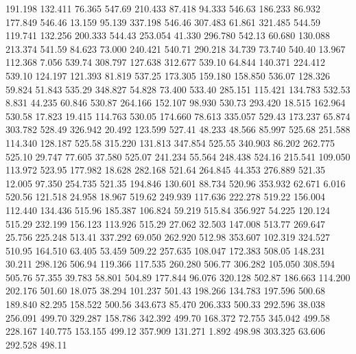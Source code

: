 191.198  132.411   76.365       547.69
 210.433   87.418   94.333       546.63
 186.233   86.932  177.849       546.46
  13.159   95.139  337.198       546.46
 307.483   61.861  321.485       544.59
 119.741  132.256  200.333       544.43
 253.054   41.330  296.780       542.13
  60.680  130.088  213.374       541.59
  84.623   73.000  240.421       540.71
 290.218   34.739   73.740       540.40
  13.967  112.368    7.056       539.74
 308.797  127.638  312.677       539.10
  64.844  140.371  224.412       539.10
 124.197  121.393   81.819       537.25
 173.305  159.180  158.850       536.07
 128.326   59.824   51.843       535.29
 348.827   54.828   73.400       533.40
 285.151  115.421  134.783       532.53
   8.831   44.235   60.846       530.87
 264.166  152.107   98.930       530.73
 293.420   18.515  162.964       530.58
  17.823   19.415  114.763       530.05
 174.660   78.613  335.057       529.43
 173.237   65.874  303.782       528.49
 326.942   20.492  123.599       527.41
  48.233   48.566   85.997       525.68
 251.588  114.340  128.187       525.58
 315.220  131.813  347.854       525.55
 340.903   86.202  262.775       525.10
  29.747   77.605   37.580       525.07
 241.234   55.564  248.438       524.16
 215.541  109.050  113.972       523.95
 177.982   18.628  282.168       521.64
 264.845   44.353  276.889       521.35
  12.005   97.350  254.735       521.35
 194.846  130.601   88.734       520.96
 353.932   62.671    6.016       520.56
 121.518   24.958   18.967       519.62
 249.939  117.636  222.278       519.22
 156.004  112.440  134.436       515.96
 185.387  106.824   59.219       515.84
 356.927   54.225  120.124       515.29
 232.199  156.123  113.926       515.29
  27.062   32.503  147.008       513.77
 269.647   25.756  225.248       513.41
 337.292   69.050  262.920       512.98
 353.607  102.319  324.527       510.95
 164.510   63.405   53.459       509.22
 257.635  108.047  172.383       508.05
 148.231   30.211  298.126       506.94
 119.366  117.535  260.280       506.77
 306.282  105.050  308.594       505.76
  57.355   39.783   58.801       504.89
 177.844   96.076  320.128       502.87
 186.663  114.200  202.176       501.60
  18.075   38.294  101.237       501.43
 198.266  134.783  197.596       500.68
 189.840   82.295  158.522       500.56
 343.673   85.470  206.333       500.33
 292.596   38.038  256.091       499.70
 329.287  158.786  342.392       499.70
 168.372   72.755  345.042       499.58
 228.167  140.775  153.155       499.12
 357.909  131.271    1.892       498.98
 303.325   63.606  292.528       498.11
